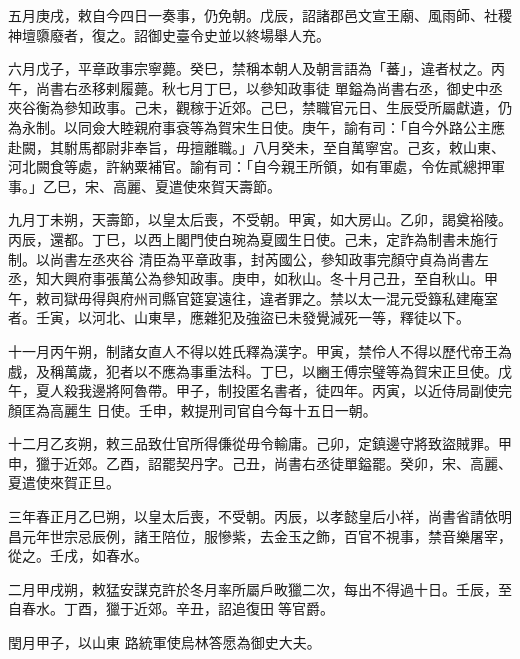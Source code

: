 \begin{pinyinscope}
 五月庚戌，敕自今四日一奏事，仍免朝。戊辰，詔諸郡邑文宣王廟、風雨師、社稷神壇隳廢者，復之。詔御史臺令史並以終場舉人充。



 六月戊子，平章政事宗寧薨。癸巳，禁稱本朝人及朝言語為「蕃」，違者杖之。丙午，尚書右丞移剌履薨。秋七月丁巳，以參知政事徒
 單鎰為尚書右丞，御史中丞夾谷衡為參知政事。己未，觀稼于近郊。己巳，禁職官元日、生辰受所屬獻遺，仍為永制。以同僉大睦親府事袞等為賀宋生日使。庚午，諭有司：「自今外路公主應赴闕，其駙馬都尉非奉旨，毋擅離職。」八月癸未，至自萬寧宮。己亥，敕山東、河北闕食等處，許納粟補官。諭有司：「自今親王所領，如有軍處，令佐貳總押軍事。」乙巳，宋、高麗、夏遣使來賀天壽節。



 九月丁未朔，天壽節，以皇太后喪，不受朝。甲寅，如大房山。乙卯，謁奠裕陵。丙辰，還都。丁巳，以西上閣門使白琬為夏國生日使。己未，定詐為制書未施行制。以尚書左丞夾谷
 清臣為平章政事，封芮國公，參知政事完顏守貞為尚書左丞，知大興府事張萬公為參知政事。庚申，如秋山。冬十月己丑，至自秋山。甲午，敕司獄毋得與府州司縣官筵宴遠往，違者罪之。禁以太一混元受籙私建庵室者。壬寅，以河北、山東旱，應雜犯及強盜已未發覺減死一等，釋徒以下。



 十一月丙午朔，制諸女直人不得以姓氏釋為漢字。甲寅，禁伶人不得以歷代帝王為戲，及稱萬歲，犯者以不應為事重法科。丁巳，以豳王傅宗璧等為賀宋正旦使。戊午，夏人殺我邊將阿魯帶。甲子，制投匿名書者，徒四年。丙寅，以近侍局副使完顏匡為高麗生
 日使。壬申，敕提刑司官自今每十五日一朝。



 十二月乙亥朔，敕三品致仕官所得傔從毋令輸庸。己卯，定鎮邊守將致盜賊罪。甲申，獵于近郊。乙酉，詔罷契丹字。己丑，尚書右丞徒單鎰罷。癸卯，宋、高麗、夏遣使來賀正旦。



 三年春正月乙巳朔，以皇太后喪，不受朝。丙辰，以孝懿皇后小祥，尚書省請依明昌元年世宗忌辰例，諸王陪位，服慘紫，去金玉之飾，百官不視事，禁音樂屠宰，從之。壬戌，如春水。



 二月甲戌朔，敕猛安謀克許於冬月率所屬戶畋獵二次，每出不得過十日。壬辰，至自春水。丁酉，獵于近郊。辛丑，詔追復田等官爵。



 閏月甲子，以山東
 路統軍使烏林答愿為御史大夫。




\end{pinyinscope}

